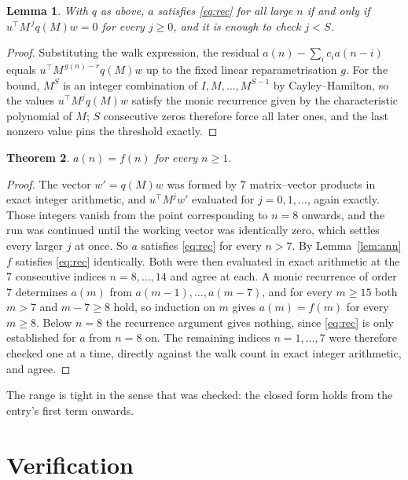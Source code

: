 \documentclass[11pt,a4paper]{article}
\theoremstyle{plain}
\newtheorem{theorem}{Theorem}
\newtheorem{lemma}[theorem]{Lemma}
\theoremstyle{definition}
\begin{document}
\begin{lemma}\label{lem:crit}
With $q$ as above, $a$ satisfies \eqref{eq:rec} for all large $n$ if and only if
$u^{\!\top}M^{\,j}q(M)w=0$ for every $j\ge0$, and it is enough to check $j<S$.
\end{lemma}

\begin{proof}
Substituting the walk expression, the residual $a(n)-\sum_ic_ia(n-i)$ equals
$u^{\!\top}M^{\,g(n)-r}q(M)w$ up to the fixed linear reparametrisation $g$. For the bound,
$M^{S}$ is an integer combination of $I,M,\dots,M^{S-1}$ by Cayley--Hamilton, so the values
$u^{\!\top}M^{j}q(M)w$ satisfy the monic recurrence given by the characteristic polynomial of
$M$; $S$ consecutive zeros therefore force all later ones, and the last nonzero value pins the
threshold exactly.
\end{proof}

\begin{theorem}
$a(n)=f(n)$ for every $n\ge1$.
\end{theorem}

\begin{proof}
The vector $w'=q(M)w$ was formed by $7$ matrix--vector products in exact integer
arithmetic, and $u^{\!\top}M^{j}w'$ evaluated for $j=0,1,\dots$, again exactly. Those integers
vanish from the point corresponding to $n=8$ onwards, and the run was continued until the
working vector was identically zero, which settles every larger $j$ at once. So $a$ satisfies
\eqref{eq:rec} for every $n>7$. By Lemma~\ref{lem:ann} $f$ satisfies \eqref{eq:rec}
identically. Both were then evaluated in exact arithmetic at the $7$ consecutive indices
$n=8,\dots,14$ and agree at each. A monic recurrence of order $7$
determines $a(m)$ from $a(m-1),\dots,a(m-7)$, and for every $m\ge15$ both
$m>7$ and $m-7\ge8$ hold, so induction on $m$ gives $a(m)=f(m)$ for every
$m\ge8$.
Below $n=8$ the recurrence argument gives nothing, since \eqref{eq:rec} is only
established for $a$ from $n=8$ on. The remaining indices $n=1,\dots,7$ were
therefore checked one at a time, directly against the walk count in exact integer arithmetic,
and agree.
\end{proof}

The range is tight in the sense that was checked: the closed form holds from the entry's first term onwards.

\section{Verification}
\end{document}
